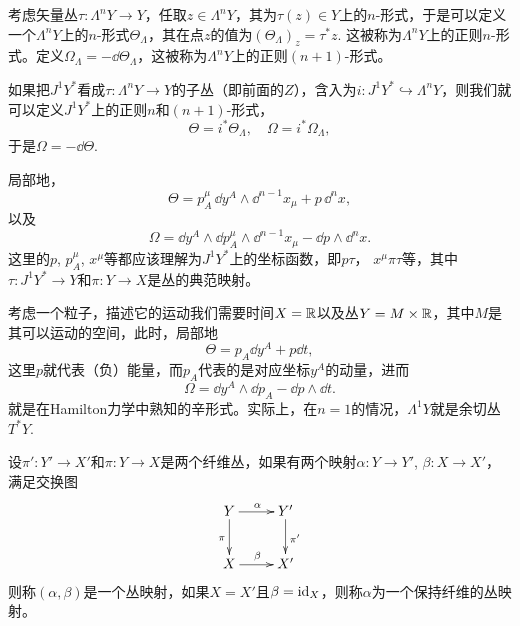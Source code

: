 \begin{para}[正则形式]
   考虑矢量丛$\tau:\Lambda^n Y\to Y$，任取$z\in \Lambda^n Y$，其为$\tau(z)\in Y$上的$n$-形式，于是可以定义一个$\Lambda^n Y$上的$n$-形式$\Theta_\Lambda$，其在点$z$的值为$(\Theta_\Lambda)_z=\tau^*z$. 这被称为$\Lambda^n Y$上的正则$n$-形式。定义$\Omega_\Lambda=-\dd \Theta_\Lambda$，这被称为$\Lambda^n Y$上的正则$(n+1)$-形式。

    如果把$J^1Y^*$看成$\tau:\Lambda^n Y\to Y$的子丛（即前面的$Z$），含入为$i:J^1Y^*\hookrightarrow \Lambda^n Y$，则我们就可以定义$J^1Y^*$上的正则$n$和$(n+1)$-形式，
    \[
        \Theta=i^*\Theta_\Lambda,\quad \Omega=i^*\Omega_\Lambda,
    \]
    于是$\Omega=-\dd \Theta$.
\end{para}

局部地，
\[
    \Theta=p_A^\mu\,\dd y^A\wedge \dd^{n-1}x_\mu + p\, \dd^n x,
\]
以及
\[
    \Omega=\dd y^A\wedge\dd p_A^\mu\wedge\dd ^{n-1}x_\mu-\dd p\wedge\dd^{n}x.
\]
这里的$p$, $p^\mu_A$, $x^\mu$等都应该理解为$J^1Y^*$上的坐标函数，即$p\tau$， $x^\mu\pi\tau$等，其中$\tau:J^1Y^*\to Y$和$\pi:Y\to X$是丛的典范映射。

\begin{para}[点粒子的例子]
    考虑一个粒子，描述它的运动我们需要时间$X=\mathbb{R}$以及丛$Y=M\times \mathbb{R}$，其中$M$是其可以运动的空间，此时，局部地
    \[
        \Theta = p_A\dd y^A+p\dd t,
    \]
    这里$p$就代表（负）能量，而$p_A$代表的是对应坐标$y^A$的动量，进而
    \[
        \Omega=\dd y^A\wedge\dd p_A-\dd p\wedge\dd t.
    \]
    就是在Hamilton力学中熟知的辛形式。实际上，在$n=1$的情况，$\Lambda^1Y$就是余切丛$T^*Y$.
\end{para}

\begin{para}[丛映射]
    设$\pi':Y'\to X'$和$\pi:Y\to X$是两个纤维丛，如果有两个映射$\alpha:Y\to Y'$, $\beta:X\to X'$，满足交换图
    \[
        \xymatrix{
            Y\ar[d]_\pi\ar[r]^\alpha&Y'\ar[d]^{\pi'}\\
            X\ar[r]^\beta&X'
        }
    \]
    则称$(\alpha,\beta)$是一个丛映射，如果$X=X'$且$\beta=\operatorname{id}_X$，则称$\alpha$为一个保持纤维的丛映射。
\end{para}

